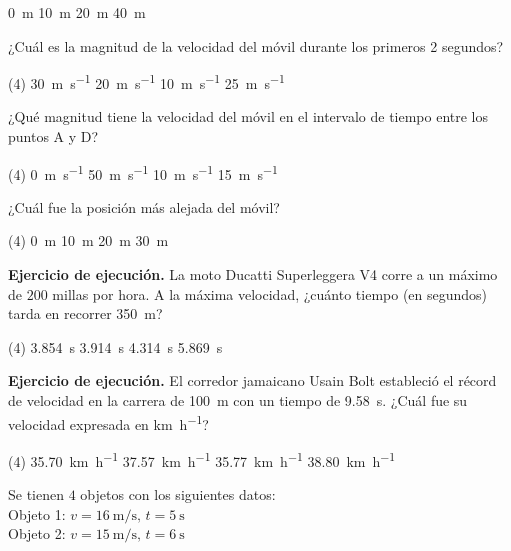 \documentclass[12pt, letter]{exam}
\begin{document}
\begin{questions}
\begin{tasks}
        \task \SI{0}{\meter}
        \task \SI{10}{\meter}
        \task \SI{20}{\meter}
        \task \SI{40}{\meter}
    \end{tasks}
    \question \label{grafica_02} ¿Cuál es la magnitud de la velocidad del móvil durante los primeros 2 segundos?
    \begin{tasks}(4)
        \task \SI{30}{\meter\per\second}
        \task \SI{20}{\meter\per\second}
        \task \SI{10}{\meter\per\second}
        \task \SI{25}{\meter\per\second}
    \end{tasks}
    \question \label{grafica_03} ¿Qué magnitud tiene la velocidad del móvil en el intervalo de tiempo entre los puntos A y D?
    \begin{tasks}(4)
        \task \SI{0}{\meter\per\second}
        \task \SI{50}{\meter\per\second}
        \task \SI{10}{\meter\per\second}
        \task \SI{15}{\meter\per\second}
    \end{tasks}
    \question \label{grafica_04} ¿Cuál fue la posición más alejada del móvil?
    \begin{tasks}(4)
        \task \SI{0}{\meter}
        \task \SI{10}{\meter}
        \task \SI{20}{\meter}
        \task \SI{30}{\meter}
    \end{tasks}
    \question \textbf{Ejercicio de ejecución.} La moto Ducatti Superleggera V4 corre a un máximo de $200$ millas por hora. A la máxima velocidad, ¿cuánto tiempo (en segundos) tarda en recorrer \SI{350}{\meter}?
    \begin{tasks}(4)
        \task \SI{3.854}{\second}
        \task \SI{3.914}{\second}
        \task \SI{4.314}{\second}
        \task \SI{5.869}{\second}
    \end{tasks}
    \question \textbf{Ejercicio de ejecución.} El corredor jamaicano Usain Bolt estableció el récord de velocidad en la carrera de \SI{100}{\meter} con un tiempo de \SI{9.58}{\second}. ¿Cuál fue su velocidad expresada en \unit{\kilo\meter\per\hour}?
    \begin{tasks}(4)
        \task \SI{35.70}{\kilo\meter\per\hour}
        \task \SI{37.57}{\kilo\meter\per\hour}
        \task \SI{35.77}{\kilo\meter\per\hour}
        \task \SI{38.80}{\kilo\meter\per\hour}
    \end{tasks}
    \question Se tienen $4$ objetos con los siguientes datos: \\
    Objeto 1: $v = \SI{16}{\meter\per\second}, \, t = \SI{5}{\second}$ \\
    Objeto 2: $v = \SI{15}{\meter\per\second}, \, t = \SI{6}{\second}$ \\

\end{questions}
\end{document}
